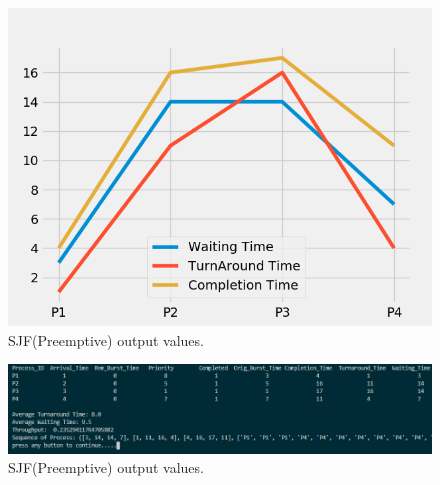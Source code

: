 \documentclass[11pt,a4paper]{report}
\begin{document}
{\begin{figure}[H]
	\centering
	\includegraphics[scale=0.75]{./img/PRIORITY_P_output.png}
	\caption{SJF(Preemptive) output values.}
\end{figure}}

{\begin{figure}[H]
	\centering
	\includegraphics[scale=0.5]{./img/priority_p_out.PNG}
	\caption{SJF(Preemptive) output values.}
\end{figure}}
\end{document}
